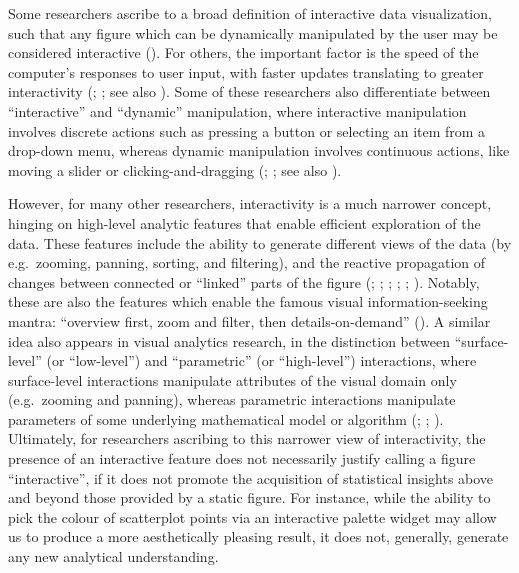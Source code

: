 \documentclass[
  openany]{book}
\theoremstyle{definition}
\theoremstyle{definition}
\theoremstyle{definition}
\theoremstyle{definition}
\theoremstyle{remark}
\begin{document}
Some researchers ascribe to a broad definition of interactive data visualization, such that any figure which can be dynamically manipulated by the user may be considered interactive (). For others, the important factor is the speed of the computer's responses to user input, with faster updates translating to greater interactivity (; ; see also ). Some of these researchers also differentiate between ``interactive'' and ``dynamic'' manipulation, where interactive manipulation involves discrete actions such as pressing a button or selecting an item from a drop-down menu, whereas dynamic manipulation involves continuous actions, like moving a slider or clicking-and-dragging (; ; see also ).

However, for many other researchers, interactivity is a much narrower concept, hinging on high-level analytic features that enable efficient exploration of the data. These features include the ability to generate different views of the data (by e.g.~zooming, panning, sorting, and filtering), and the reactive propagation of changes between connected or ``linked'' parts of the figure (; ; ; ; ; ). Notably, these are also the features which enable the famous visual information-seeking mantra: ``overview first, zoom and filter, then details-on-demand'' (). A similar idea also appears in visual analytics research, in the distinction between ``surface-level'' (or ``low-level'') and ``parametric'' (or ``high-level'') interactions, where surface-level interactions manipulate attributes of the visual domain only (e.g.~zooming and panning), whereas parametric interactions manipulate parameters of some underlying mathematical model or algorithm (; ; ). Ultimately, for researchers ascribing to this narrower view of interactivity, the presence of an interactive feature does not necessarily justify calling a figure ``interactive'', if it does not promote the acquisition of statistical insights above and beyond those provided by a static figure. For instance, while the ability to pick the colour of scatterplot points via an interactive palette widget may allow us to produce a more aesthetically pleasing result, it does not, generally, generate any new analytical understanding.
\end{document}
